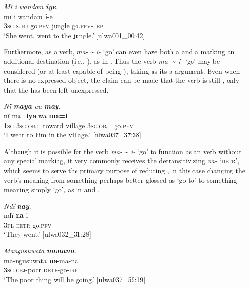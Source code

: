 \ea%
    \label{ex:syntax:301}
          \textit{Mï i wandam} \textbf{\textit{iye}}.\\
\gll mï      i    wandam  \textbf{i}{}-e\\
    3\textsc{sg.subj}  go.\textsc{pfv}  jungle    go.\textsc{pfv-dep}\\
\glt `She went, went to the jungle.’ [ulwa001\_00:42]
\z

Furthermore, as a  verb, \textit{ma-} {\textasciitilde} \textit{i-} ‘go’ can even have both a  and a  marking an additional destination (i.e., ), as in . Thus the verb \textit{ma-} {\textasciitilde} \textit{i-} ‘go’ may be considered  (or at least capable of being ), taking as its  a  argument. Even when there is no expressed object, the claim can be made that the verb is still , only that the  has been left unexpressed.

\ea%
    \label{ex:syntax:302}
          \textit{Nï} \textbf{\textit{maya}} \textit{wa} \textbf{\textit{may}}.\\
\gll nï    ma=\textbf{iya}      wa    \textbf{ma=i}\\
    1\textsc{sg}  3\textsc{sg.obj}=toward  village  3\textsc{sg.obj}=go.\textsc{pfv}\\
\glt `I went to him in the village.’ [ulwa037\_37:38]
\z

  Although it is possible for the verb \textit{ma-} {\textasciitilde} \textit{i-} ‘go’ to function as an  verb without any special marking, it very commonly receives the detransitivizing  \textit{na-} \textsc{‘detr’}, which seems to serve the primary purpose of reducing , in this case changing the verb’s meaning from something perhaps better glossed as ‘go to’ to something meaning simply ‘go’, as in  and .

\ea%
    \label{ex:syntax:303}
          \textit{Ndï} \textbf{\textit{nay}}.\\
\gll ndï  \textbf{na}{}-i\\
    3\textsc{pl}  \textsc{detr-}go.\textsc{pfv}\\
\glt `They went.’ [ulwa032\_31:28]
\z

\ea%
    \label{ex:syntax:304}
          \textit{Mangusuwata} \textbf{\textit{namana}}.\\
\gll ma-ngusuwata  \textbf{na}{}-ma-na\\
    3\textsc{sg.obj-}poor  \textsc{detr-}go-\textsc{irr}\\
\glt `The poor thing will be going.’ [ulwa037\_59:19]
\z


